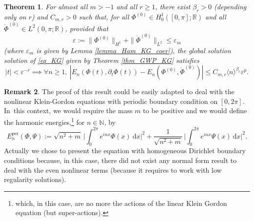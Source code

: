 \documentclass[11pt]{article}
\newtheorem{theorem}{Theorem}[section]
\theoremstyle{definition}
\newtheorem{remark}[theorem]{Remark}
\begin{document}
\begin{theorem}
\label{thm_main_KG}
For almost all $m>-1$ and all $r\geq 1$, there exist $\beta_r>0$ (depen\-ding only on $r$) and $C_{m,r}>0$ such that, for all
$\Phi^{(0)} \in H^1_0([0,\pi];\mathbb{R})$ and all $\dot{\Phi}^{(0)} \in L^2(0,\pi;\mathbb{R})$, provided that
\[
\varepsilon:=\|\Phi^{(0)}\|_{H^1} +\|\dot{\Phi}^{(0)}\|_{ L^2} \leq \varepsilon_m
\]
(where $\varepsilon_m$ is given by Lemma \ref{lemma_Ham_KG_coer}), the global solution solution of \eqref{eq_KG} given by Theorem \ref{thm_GWP_KG} satisfies
\[
|t|< \varepsilon^{-r} \implies \forall n\geq 1, \ |E_n(\Phi(t),\partial_t \Phi(t)) - E_n(\Phi^{(0)},\dot{\Phi}^{(0)})| \leq C_{m,r} \langle n \rangle^{\beta_r} \varepsilon^{p}.
\]
\end{theorem}
\begin{remark}\label{rem_KG_per} The proof of this result could be easily adapted to deal with the nonlinear Klein-Gordon equations with periodic boundary condition on $[0,2\pi]$. In~this context, we would require the mass $m$ to be positive and we would define the harmonic energies,\footnote{which, in this case, are no more the actions of the linear Klein Gordon equation (but super-actions).} for $n\in \mathbb{N}$, by
\begin{equation*}
E_n^{\mathrm{per}}(\Phi,\Psi):= \sqrt{n^2+m}\, \biggl| \int_0^{2\pi} e^{inx} \Phi(x) \ \mathrm{d}x \biggr|^2+ \frac1{\sqrt{n^2+m}}\, \biggl| \int_0^{2\pi} e^{inx} \Psi(x) \ \mathrm{d}x \biggr|^2.
\end{equation*}
Actually we chose to present the equation with homogeneous Dirichlet boundary conditions because, in this case, there did not exist any normal form result to deal with the even nonlinear terms (because it requires to work with low regularity solutions).
\end{remark}
\end{document}
